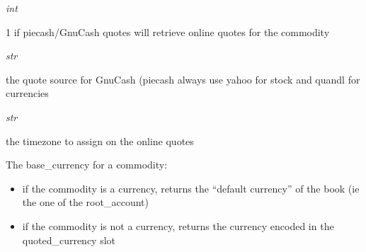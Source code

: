 \documentclass[letterpaper,10pt,english]{sphinxmanual}
\begin{document}
\begin{fulllineitems}

\begin{fulllineitems}
\label{api/piecash.model_core.commodity:piecash.model_core.commodity.Commodity.quote_flag}
\emph{int}

1 if piecash/GnuCash quotes will retrieve online quotes for the commodity

\end{fulllineitems}


\begin{fulllineitems}
\label{api/piecash.model_core.commodity:piecash.model_core.commodity.Commodity.quote_source}
\emph{str}

the quote source for GnuCash (piecash always use yahoo for stock and quandl for currencies

\end{fulllineitems}


\begin{fulllineitems}
\label{api/piecash.model_core.commodity:piecash.model_core.commodity.Commodity.quote_tz}
\emph{str}

the timezone to assign on the online quotes

\end{fulllineitems}


\begin{fulllineitems}
\label{api/piecash.model_core.commodity:piecash.model_core.commodity.Commodity.base_currency}
{\hyperref[api/piecash.model_core.commodity:piecash.model_core.commodity.Commodity]{}}

The base\_currency for a commodity:
\begin{itemize}
\item {} 
if the commodity is a currency, returns the ``default currency'' of the book (ie the one of the root\_account)

\item {} 
if the commodity is not a currency, returns the currency encoded in the quoted\_currency slot


\end{itemize}
\end{fulllineitems}
\end{fulllineitems}
\end{document}
